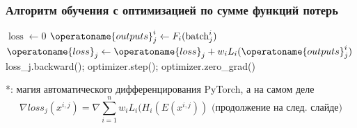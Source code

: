 \documentclass[aspectratio=169]{beamer}
\begin{document}
\begin{frame}
	\frametitle{Алгоритм обучения с оптимизацией по сумме функций потерь}
	\begin{algorithmic}
		 
			  
				\State $\operatorname{loss} \gets 0$
				 
					\State $\operatoname{outputs}^{i}_{j} \gets F_i(\operatorname{batch}^{i}_{j})$
					\State $\operatoname{loss}_j \gets \operatoname{loss}_j + w_i L_i(\operatoname{outputs}^{i}_{j}) $
				\EndFor
				\State loss_j.backward(); optimizer.step(); optimizer.zero\_grad() \Comment{*}
			\EndFor
		\EndFor
	\end{algorithmic}
	*: магия автоматического дифференцирования PyTorch, а на самом деле
	\begin{equation*}
		\nabla loss_j(x^{i, j}) = \nabla \sum_{i = 1}^{n} w_i L_i(H_i(E(x^{i, j})) \text{ (продолжение на след. слайде)}
	\end{equation*}
\end{frame}
\end{document}
